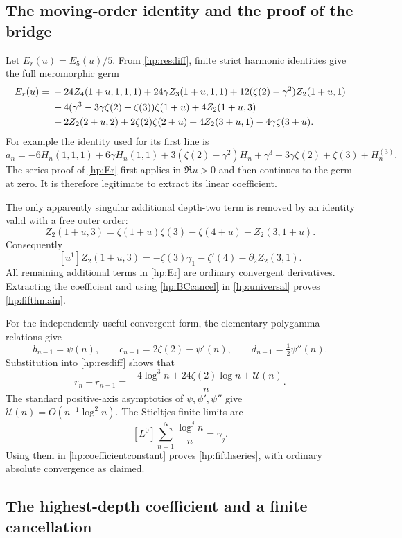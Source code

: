 \documentclass[11pt]{article}
\numberwithin{equation}{section}
\theoremstyle{plain}
\theoremstyle{definition}
\theoremstyle{remark}
\begin{document}
\subsection{The moving-order identity and the proof of the bridge}

Let $E_r(u)=E_5(u)/5$. From \eqref{hp:resdiff}, finite strict
harmonic identities give the full meromorphic germ
\begin{align}\label{hp:Er}
 E_r(u)={}&-24Z_4(1+u,1,1,1)+24\gamma Z_3(1+u,1,1)
         +12(\zeta(2)-\gamma^2)Z_2(1+u,1)\notag\\
 &+4(\gamma^3-3\gamma\zeta(2)+\zeta(3))\zeta(1+u)
       +4Z_2(1+u,3)\notag\\
 &+2Z_2(2+u,2)+2\zeta(2)\zeta(2+u)
                    +4Z_2(3+u,1)-4\gamma\zeta(3+u).
\end{align}
For example the identity used for its first line is
\[
 a_n=-6H_n(1,1,1)+6\gamma H_n(1,1)
       +3(\zeta(2)-\gamma^2)H_n
       +\gamma^3-3\gamma\zeta(2)+\zeta(3)+H_n^{(3)}.
\]
The series proof of \eqref{hp:Er} first applies in $\Re u>0$ and
then continues to the germ at zero. It is therefore legitimate to
extract its linear coefficient.

The only apparently singular additional depth-two term is removed
by an identity valid with a free outer order:
\[
 Z_2(1+u,3)=\zeta(1+u)\zeta(3)-\zeta(4+u)-Z_2(3,1+u).
\]
Consequently
\[
 [u^1]Z_2(1+u,3)
       =-\zeta(3)\gamma_1-\zeta'(4)-\partial_2Z_2(3,1).
\]
All remaining additional terms in \eqref{hp:Er} are ordinary
convergent derivatives. Extracting the coefficient and using
\eqref{hp:BCcancel} in \eqref{hp:universal} proves
\eqref{hp:fifthmain}.

For the independently useful convergent form, the elementary
polygamma relations give
\[
 b_{n-1}=\psi(n),\qquad c_{n-1}=2\zeta(2)-\psi'(n),\qquad
 d_{n-1}=\tfrac12\psi''(n).
\]
Substitution into \eqref{hp:resdiff} shows that
\[
 r_n-r_{n-1}
   =\frac{-4\log^3n+24\zeta(2)\log n+\mathcal U(n)}n.
\]
The standard positive-axis asymptotics of $\psi,\psi',\psi''$
give $\mathcal U(n)=O(n^{-1}\log^2 n)$.
The Stieltjes finite limits are
\[
 [L^0]\sum_{n=1}^N\frac{\log^j n}{n}=\gamma_j.
\]
Using them in \eqref{hp:coefficientconstant} proves
\eqref{hp:fifthseries}, with ordinary absolute convergence as
claimed.

\subsection{The highest-depth coefficient and a finite cancellation}
\end{document}
